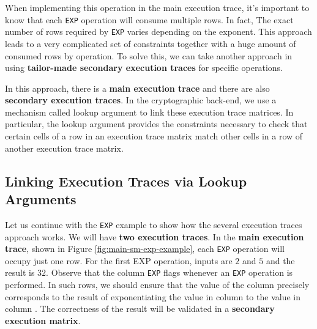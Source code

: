 When implementing this operation in the main execution trace, it's important to know that each \texttt{EXP} operation will consume multiple rows. In fact, The exact number of rows required by \texttt{EXP} varies depending on the exponent. This approach leads to a very complicated set of constraints together with a huge amount of consumed rows by operation. To solve this, we can take another approach in using \textbf{tailor-made secondary execution traces} for specific operations.

In this approach, there is a \textbf{main execution trace} and there are also \textbf{secondary execution traces}. In the cryptographic back-end, we use a mechanism called lookup argument to link these execution trace matrices. In particular, the lookup argument provides the constraints necessary to check that
certain cells of a row in an execution trace matrix match other cells in a row of another execution trace matrix.

\subsection{Linking Execution Traces via Lookup Arguments}

Let us continue with the \texttt{EXP} example to show how the several execution traces approach works. We will have \textbf{two execution traces}. In the \textbf{main execution trace}, shown in Figure \ref{fig:main-sm-exp-example}, each \texttt{EXP} operation will occupy just one row. For the first EXP operation, inputs are $2$ and $5$ and the result is $32$. Observe that the column \texttt{EXP} flags whenever an \texttt{EXP} operation is performed. In such rows, we should ensure that the value of the column \C precisely corresponds to the result of exponentiating the value in column \A to the value in column \B. The correctness of the result will be validated in a \textbf{secondary execution matrix}.

